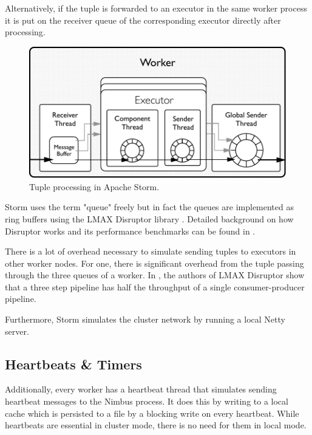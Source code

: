 Alternatively, if the tuple is forwarded to an executor in the same worker process it is put on the receiver queue of the corresponding executor directly after processing.

\begin{figure}[!htb]
	\centering
	\includegraphics[scale=0.7]{pdf/worker_inside.pdf}
	\caption{Tuple processing in Apache Storm.}
	\label{fig:worker_inside}
\end{figure}

Storm uses the term "queue" freely but in fact the queues are implemented as ring buffers using the LMAX Disruptor library \cite{LMAXDisruptor}. Detailed background on how Disruptor works and its performance benchmarks can be found in \cite{Thompson_Farley_Barker_Gee_Stewart_2011}.

There is a lot of overhead necessary to simulate sending tuples to executors in other worker nodes. For one, there is significant overhead from the tuple passing through the three queues of a worker. In \cite{DisruptorWiki}, the authors of LMAX Disruptor show that a three step pipeline has half the throughput of a single consumer-producer pipeline.

Furthermore, Storm simulates the cluster network by running a local Netty \cite{Netty} server.

\subsection{Heartbeats \& Timers}

Additionally, every worker has a heartbeat thread that simulates sending heartbeat messages to the Nimbus process. It does this by writing to a local cache which is persisted to a file by a blocking write on every heartbeat. While heartbeats are essential in cluster mode, there is no need for them in local mode.

